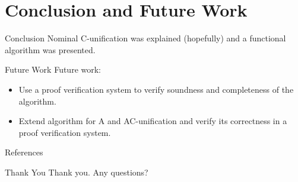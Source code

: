 \section{Conclusion and Future Work}

\begin{frame}{Conclusion}
    Nominal C-unification was explained (hopefully) and a functional algorithm was
    presented.  
\end{frame}

\begin{frame}{Future Work}
    Future work:  
    \begin{itemize}
        \item Use a proof verification system to verify soundness and completeness of
            the algorithm. 
        \item Extend algorithm for A and AC-unification and verify its correctness in
            a proof verification system. 
    \end{itemize}
\end{frame}

\begin{frame}[allowframebreaks]{References}
        \nocite{*}
        
        
\end{frame}

\begin{frame}{Thank You}
    Thank you. Any questions?
\end{frame}

